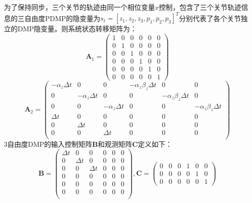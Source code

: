 为了保持同步，三个关节的轨迹由同一个相位变量$x$控制，包含了三个关节轨迹信息的三自由度PDMP的隐变量为$s_t=[z_1,z_2,z_3,p_1,p_2,p_3]^T$分别代表了各个关节独立的DMP隐变量。则系统状态转移矩阵为：
\begin{equation}
    \mathbf{A}_1=\left(\begin{array}{llllll}
    1 & 0 & 0 & 0 & 0 & 0\\
    0 & 1 & 0 & 0 & 0 & 0\\
    0 & 0 & 1 & 0 & 0 & 0\\
    0 & 0 & 0 & 1 & 0 & 0\\
    0 & 0 & 0 & 0 & 1 & 0\\
    0 & 0 & 0 & 0 & 0 & 1
    \end{array}\right)
\end{equation}
\begin{equation}
    \mathbf{A}_2=\left(\begin{array}{cccccc}
    -\alpha_z \Delta t & 0 & 0 & -\alpha_z \beta_z \Delta t & 0 & 0 \\
    0 &-\alpha_z \Delta t & 0 & 0 &-\alpha_z \beta_z \Delta t & 0 \\
    0 & 0 & -\alpha_z \Delta t & 0 & 0 &  -\alpha_z \beta_z \Delta t \\
    \Delta t & 0 & 0 & 0 & 0 & 0 \\
    0 & \Delta t & 0 & 0 & 0 & 0 \\
    0 & 0 & \Delta t &  0 & 0 & 0 \\
    \end{array}\right)
\end{equation}
3自由度DMP的输入控制矩阵$\mathbf{B}$和观测矩阵$\mathbf{C}$定义如下：
\begin{equation}
    \mathbf{B}=\left(\begin{array}{cccccc}
    \Delta t & 0 & 0 & 0& 0& 0\\
    0 & \Delta t & 0 & 0& 0& 0\\
    0 & 0 & \Delta t & 0& 0& 0\\
    0 & 0 & 0 & 0& 0& 0\\
    0 & 0 & 0 & 0& 0& 0\\
    0 & 0 & 0 & 0& 0& 0\\
    \end{array}\right), \mathbf{C}=\left(\begin{array}{llllll}
    0 & 0 & 0 & 1 & 0 &0\\
    0 & 0 & 0 & 0 & 1 &0\\
    0 & 0 & 0 & 0 & 0 &1
    \end{array}\right)
\end{equation}

